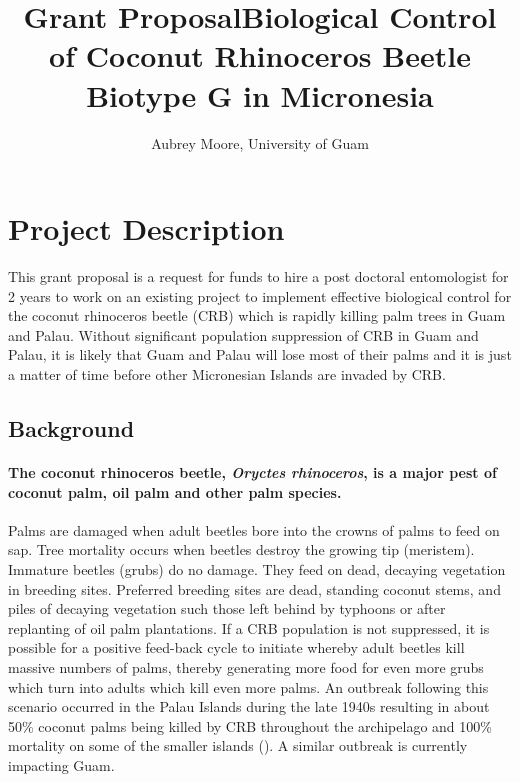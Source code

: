 \documentclass[12pt,letterpaper,english,bibliography=totocnumbered, abstract=on]{scrartcl}
\begin{document}
\title{Grant Proposal}

\title{Biological Control of Coconut Rhinoceros Beetle Biotype G in Micronesia }

\author{Aubrey Moore, University of Guam}

\maketitle
\tableofcontents

\pagebreak

\section{Project Description}

This grant proposal is a request for funds to hire a post doctoral
entomologist for 2 years to work on an existing project to implement
effective biological control for the coconut rhinoceros beetle (CRB)
which is rapidly killing palm trees in Guam and Palau. Without significant
population suppression of CRB in Guam and Palau, it is likely that
Guam and Palau will lose most of their palms and it is just a matter
of time before other Micronesian Islands are invaded by CRB. 

\subsection{Background}

\paragraph{The coconut rhinoceros beetle, \emph{Oryctes rhinoceros}, is a major
pest of coconut palm, oil palm and other palm species.}

Palms are damaged when adult beetles bore into the crowns of palms
to feed on sap. Tree mortality occurs when beetles destroy the growing
tip (meristem). Immature beetles (grubs) do no damage. They feed on
dead, decaying vegetation in breeding sites. Preferred breeding sites
are dead, standing coconut stems, and piles of decaying vegetation
such those left behind by typhoons or after replanting of oil palm
plantations. If a CRB population is not suppressed, it is possible
for a positive feed-back cycle to initiate whereby adult beetles kill
massive numbers of palms, thereby generating more food for even more
grubs which turn into adults which kill even more palms. An outbreak
following this scenario occurred in the Palau Islands during the late
1940s resulting in about 50\% coconut palms being killed by CRB throughout
the archipelago and 100\% mortality on some of the smaller islands
(\cite{gressitt_coconut_1953}). A similar outbreak is currently impacting
Guam.
\end{document}
